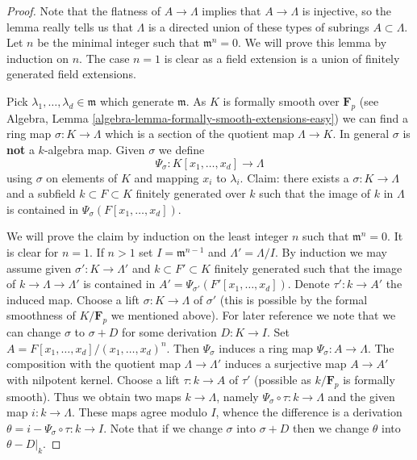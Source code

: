\begin{proof}
Note that the flatness of $A \to \Lambda$ implies that $A \to \Lambda$
is injective, so the lemma really tells us that $\Lambda$ is a
directed union of these types of subrings $A \subset \Lambda$.
Let $n$ be the minimal integer such that $\mathfrak m^n = 0$.
We will prove this lemma by induction on $n$. The case $n = 1$ is clear
as a field extension is a union of finitely generated field extensions.

\medskip\noindent
Pick $\lambda_1, \ldots, \lambda_d \in \mathfrak m$ which generate
$\mathfrak m$. As $K$ is formally smooth over $\mathbf{F}_p$ (see
Algebra, Lemma \ref{algebra-lemma-formally-smooth-extensions-easy}) we can
find a ring map $\sigma : K \to \Lambda$ which is a section of the
quotient map $\Lambda \to K$. In general $\sigma$ is {\bf not}
a $k$-algebra map. Given $\sigma$ we define
$$
\Psi_\sigma : K[x_1, \ldots, x_d] \longrightarrow \Lambda
$$
using $\sigma$ on elements of $K$ and mapping $x_i$ to $\lambda_i$.
Claim: there exists a $\sigma : K \to \Lambda$
and a subfield $k \subset F \subset K$ finitely generated over $k$
such that the image of $k$ in $\Lambda$ is contained in
$\Psi_\sigma(F[x_1, \ldots, x_d])$.

\medskip\noindent
We will prove the claim by induction on the least integer $n$ such that
$\mathfrak m^n = 0$. It is clear for $n = 1$. If $n > 1$ set
$I = \mathfrak m^{n - 1}$ and $\Lambda' = \Lambda/I$.
By induction we may assume
given $\sigma' : K \to \Lambda'$ and $k \subset F' \subset K$ finitely
generated such that the image of $k \to \Lambda \to \Lambda'$
is contained in $A' = \Psi_{\sigma'}(F'[x_1, \ldots, x_d])$.
Denote $\tau' : k \to A'$ the induced map.
Choose a lift $\sigma : K \to \Lambda$ of $\sigma'$ (this is possible
by the formal smoothness of $K/\mathbf{F}_p$ we mentioned above).
For later reference we note that we can change $\sigma$ to
$\sigma + D$ for some derivation $D : K \to I$.
Set $A = F[x_1, \ldots, x_d]/(x_1, \ldots, x_d)^n$.
Then $\Psi_\sigma$ induces a ring map
$\Psi_\sigma : A \to \Lambda$. The composition with the
quotient map $\Lambda \to \Lambda'$ induces a surjective
map $A \to A'$ with nilpotent kernel.
Choose a lift $\tau : k \to A$ of $\tau'$ (possible as $k/\mathbf{F}_p$
is formally smooth). Thus we obtain two maps $k \to \Lambda$, namely
$\Psi_\sigma \circ \tau : k \to \Lambda$ and the given map $i : k \to \Lambda$.
These maps agree modulo $I$, whence the difference is a
derivation $\theta = i - \Psi_\sigma \circ \tau : k \to I$.
Note that if we change $\sigma$ into $\sigma + D$ then we change
$\theta$ into $\theta - D|_k$.


\end{proof}
